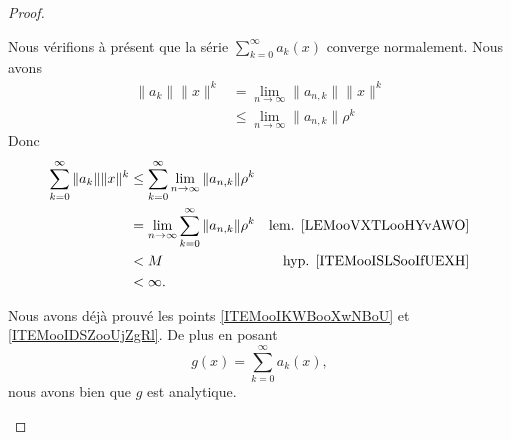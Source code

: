 \begin{proof}
\begin{subproof}
		Nous vérifions à présent que la série \( \sum_{k=0}^{\infty}a_k(x)\) converge normalement. Nous avons
		\begin{subequations}
			\begin{align}
				\| a_k \|\| x \|^k & =\lim_{n\to \infty}\| a_{n,k} \|\| x \|^k  \\
				                   & \leq \lim_{n\to \infty}\| a_{n,k} \|\rho^k
			\end{align}
		\end{subequations}
		Donc
		\begin{subequations}
			\begin{align}
				\sum_{k=0}^{\infty}\| a_k \|\| x \|^k & \leq\sum_{k=0}^{\infty}\lim_{n\to \infty}\| a_{n,k} \|\rho^k                                        \\
				                                      & =\lim_{n\to \infty}\sum_{k=0}^{\infty}\| a_{n,k} \|\rho^k    & \text{lem. \ref{LEMooVXTLooHYvAWO}}  \\
				                                      & <M                                                           & \text{hyp. \ref{ITEMooISLSooIfUEXH}} \\
				                                      & <\infty.
			\end{align}
		\end{subequations}


		Nous avons déjà prouvé les points \ref{ITEMooIKWBooXwNBoU} et \ref{ITEMooIDSZooUjZgRl}. De plus en posant
		\begin{equation}
			g(x)=\sum_{k=0}^{\infty}a_k(x),
		\end{equation}
		nous avons bien que \( g\) est analytique.


\end{subproof}
\end{proof}
